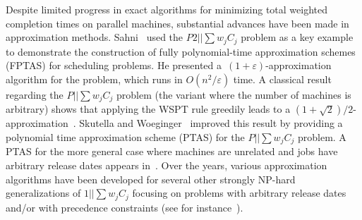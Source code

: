 Despite limited progress in exact algorithms for minimizing total weighted completion times on parallel machines, substantial advances have been made in approximation methods. Sahni~\cite{SahniFPTAS} used the $P2||\sum w_jC_j$ problem as a key example to demonstrate the construction of fully polynomial-time approximation schemes (FPTAS) for scheduling problems. He presented a~$(1+\varepsilon)$-approximation algorithm for the problem, which runs in $O(n^2/\varepsilon)$ time. A classical result regarding the $P||\sum w_j C_j$ problem (the variant where the number of machines is arbitrary) shows that applying the WSPT rule greedily leads to a $(1+\sqrt{2})/2$-approximation~\cite{KK1986}. Skutella and Woeginger~\cite{DBLP:conf/stoc/SkutellaW99} improved this result by providing a polynomial time approximation scheme (PTAS) for the $P||\sum w_j C_j$ problem. A PTAS for the more general case where
machines are unrelated and jobs have arbitrary release dates appears in~\cite{DBLP:conf/focs/AfratiBCKKKMQSSS99}. Over the years, various approximation algorithms have been developed for several other strongly NP-hard generalizations of $1||\sum w_j C_j$ focusing on problems with arbitrary release dates and/or with precedence constraints (see for instance~\cite{DBLP:conf/stoc/BansalSS16,DBLP:journals/mp/CorreaM22,DBLP:conf/focs/ImL16,DBLP:conf/sosa/JagerW24,Jaeger:18:Approximating-total-weighted,DBLP:conf/focs/Li17,SittersYang:17:A-2+epsilon-approximation}). 





